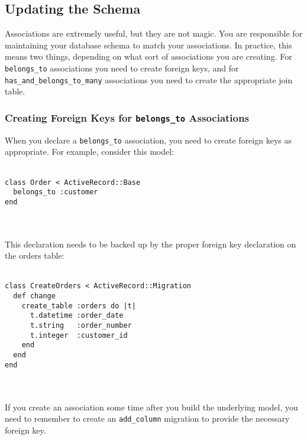 \documentclass[10pt]{book}
\begin{document}
\subsection{ Updating the Schema}

Associations are extremely useful, but they are not magic. You are  responsible for maintaining your database schema to match your  associations. In practice, this means two things, depending on what sort  of associations you are creating. For \texttt{belongs\_to} associations you need to create foreign keys, and for \texttt{has\_and\_belongs\_to\_many} associations you need to create the appropriate join table.

\subsubsection{ Creating Foreign Keys for \texttt{belongs\_to} Associations}

When you declare a \texttt{belongs\_to} association, you need to create foreign keys as appropriate. For example, consider this model:
\\ \\
\begin{minipage}{\textwidth}{\scriptsize
\begin{verbatim}
class Order < ActiveRecord::Base
  belongs_to :customer
end
\end{verbatim}}
\end{minipage}
\\ \\

This declaration needs to be backed up by the proper foreign key declaration on the orders table:
\\ \\
\begin{minipage}{\textwidth}{\scriptsize
\begin{verbatim}
class CreateOrders < ActiveRecord::Migration
  def change
    create_table :orders do |t|
      t.datetime :order_date
      t.string   :order_number
      t.integer  :customer_id
    end
  end
end
\end{verbatim}}
\end{minipage}
\\ \\

If you create an association some time after you build the underlying model, you need to remember to create an \texttt{add\_column} migration to provide the necessary foreign key.
\end{document}
